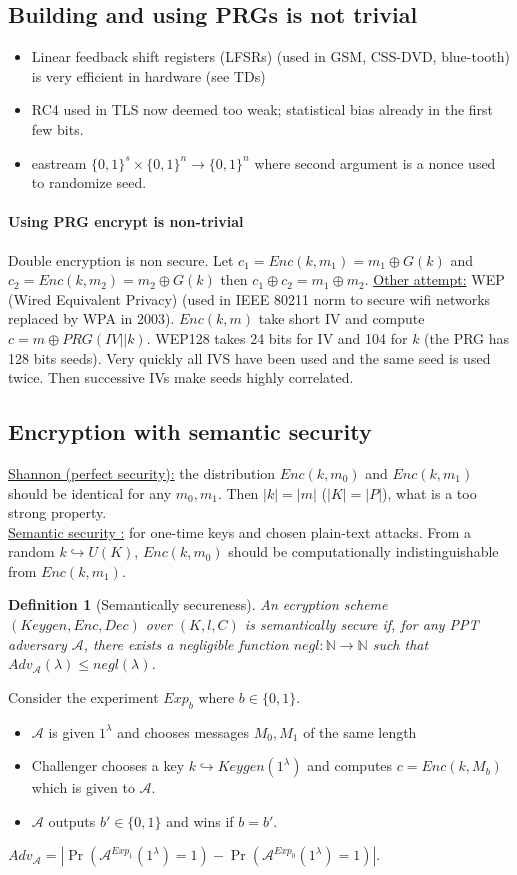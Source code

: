 \documentclass{article}
\newtheorem{defi}[thm]{Definition}
\newcommand{\Def}[3]{\begin{defi}[#1]\label{#2}#3\end{defi}}
\newcommand{\N}{\mathbb{N}}
\newcommand{\A}{\mathcal{A}}
\begin{document}
\subsection{Building and using PRGs is not trivial}
\begin{itemize}
\item Linear feedback shift registers (LFSRs) (used in GSM, CSS-DVD, blue-tooth) is very efficient in hardware (see TDs)
\item RC4 used in TLS now deemed too weak; statistical bias already in the first few bits.
\item eastream $\{0,1\}^s\times\{0,1\}^n\rightarrow\{0,1\}^n$ where second argument is a nonce used to randomize seed.
\end{itemize}
\paragraph{Using PRG encrypt is non-trivial} Double encryption is non secure. Let $c_1=Enc(k,m_1)=m_1\oplus G(k)$ and $c_2=Enc(k,m_2)=m_2\oplus G(k)$ then $c_1\oplus c_2 = m_1\oplus m_2$.
\underline{Other attempt:} WEP (Wired Equivalent Privacy) (used in IEEE 80211 norm to secure wifi networks replaced by WPA in 2003). $Enc(k,m)$ take short IV and compute $c=m\oplus PRG(IV||k)$. WEP128 takes 24 bits for IV and 104 for $k$ (the PRG has 128 bits seeds). Very quickly all IVS have been used and the same seed is used twice. Then successive IVs make seeds highly correlated.
\subsection{Encryption with semantic security}

\underline{Shannon (perfect security):} the distribution $Enc(k,m_0)$ and $Enc(k,m_1)$ should be identical for any $m_0,m_1$. Then $|k|=|m|$ ($|K|=|P|$), what is a too strong property.\\
\underline{Semantic security :} for one-time keys and chosen plain-text attacks. From a random $k\hookrightarrow U(K)$, $Enc(k,m_0)$ should be computationally indistinguishable from $Enc(k,m_1)$.

\Def{Semantically secureness}{def:semSecure}{An ecryption scheme $(Keygen,Enc,Dec)$ over $(K,l,C)$ is semantically secure if, for any PPT adversary $\A$, there exists a negligible function $negl:\N\rightarrow\N$ such that $Adv_\A(\lambda)\leq negl(\lambda)$.}

Consider the experiment $Exp_b$ where $b\in\{0,1\}$.
\begin{itemize}
\item $\A$ is given $1^\lambda$ and chooses messages $M_0,M_1$ of the same length
\item Challenger chooses a key $k\hookrightarrow Keygen(1^\lambda)$ and computes $c=Enc(k,M_b)$ which is given to $\A$.
\item $\A$ outputs $b'\in\{0,1\}$ and wins if $b=b'$. 
\end{itemize}
$Adv_\A=|\Pr(\A^{Exp_1}(1^\lambda)=1)-\Pr(\A^{Exp_0}(1^\lambda)=1)|$.
\end{document}
